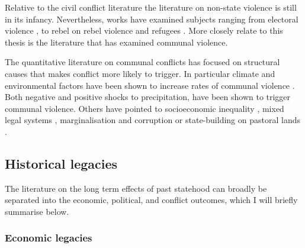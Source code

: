 Relative to the civil conflict literature the literature on non-state violence
is still in its infancy. Nevertheless, works have examined subjects ranging from
electoral violence \citep{Fjelde_2020, Salehyan_2014, Burchard_2015}, to rebel
on rebel violence \citep{Fjelde_2012, Lilja_2011, Cunningham_2012, Nygard_2014}
and refugees \citep{Bohmelt_2018}. More closely relate to this thesis is the
literature that has examined communal violence.

The quantitative literature on communal conflicts has focused on structural
causes that makes conflict more likely to trigger. In particular climate and
environmental factors have been shown to increase rates of communal violence
\citep{Turner_2011}. Both negative \citep{Detges_2017, Fjelde2012,
van_Weezel_2019, Petrova_2022} and positive \citep{Theisen2012, Witsenburg2012}
shocks to precipitation, have been shown to trigger communal violence. Others
have pointed to socioeconomic inequality \citep{Fjelde2014, PETERS_2004}, mixed
legal systems \citep{Eck2014}, marginalisation and corruption
\citep{BENJAMINSEN_2009} or state-building on pastoral lands
\citep{hagmann2008pastoral}.

\subsection{Historical legacies} \label{Historical legacies}

The literature on the long term effects of past statehood can broadly be
separated into the economic, political, and conflict outcomes, which I will
briefly summarise below.

\subsubsection{Economic legacies} \label{Economic legacies}

